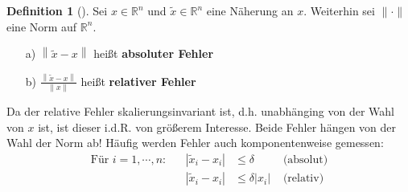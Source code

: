 \documentclass[ngerman,fontsize=11pt, paper=a4, parskip=half, titlepage=true, toc=bib]{scrbook}
\theoremstyle{definition}
\newtheorem{Def}{Definition}[section]		%
\theoremstyle{plain}
\newcommand{\R}{\mathds{R}}
\newcommand{\nn}[1]{\left\| #1 \right\|}
\newcommand{\subsectione}[1]{\subsection{#1} \addtocounter{Def}{1}}
\newenvironment{Defe}[1][]{ %
	\begin{Def}[#1]
	}
	{
	\end{Def}
	\addtocounter{subsection}{1}
}
\begin{document}
\begin{Defe}
	\label{3.2.2} 
	Sei $x\in\R^n$ und $\widetilde{x} \in \R^n$ eine Näherung an $x$. Weiterhin sei $\|\cdot\|$ eine Norm auf $\R^n$.
	\begin{itemize}
		\item[a)] $\nn{\widetilde{x} - x}$ heißt \textbf{absoluter Fehler} 
		\item[b)] $\frac{\nn{\widetilde{x} - x}}{\nn{x}}$ heißt \textbf{relativer Fehler}
	\end{itemize}
	Da der relative Fehler skalierungsinvariant ist, d.h. unabhänging von der  Wahl von $x$ ist, ist dieser i.d.R. von größerem Interesse.
	Beide Fehler hängen von der Wahl der Norm ab!
	Häufig werden Fehler auch komponentenweise gemessen:
	\begin{align*}
	\text{Für } i=1,\cdots , n : && |\widetilde{x}_i - x_i | & \leq \delta & \text{ (absolut)} \\
	&& |\widetilde{x}_i - x_i | &\leq \delta |x_i| & \text{ (relativ)}
	\end{align*}
\end{Defe}
\end{document}
